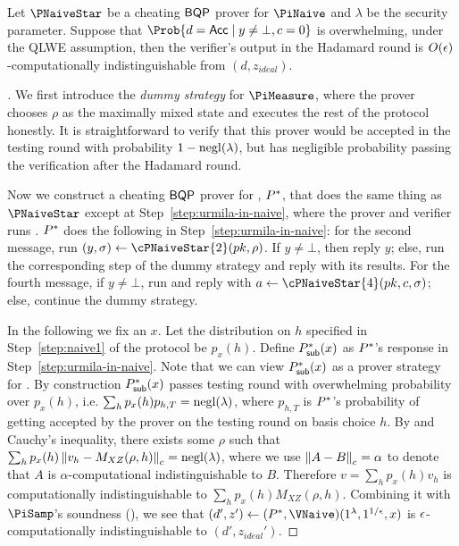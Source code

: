 \begin{theorem}
	\label{lem:naive-qpip0-binding}
	Let $\PNaiveStar$ be a cheating $\operatorname{\mathsf{BQP}}$ prover for $\PiNaive$ and $\lambda$ be the security parameter.
	Suppose that $\Prob{d=\Acc\mid y\ne\bot, c=0}$ is overwhelming, 
	under the QLWE assumption, then the verifier's output in the Hadamard round is $O(\epsilon)$-computationally indistinguishable from $(d, z_{ideal})$.
\end{theorem}
\begin{proof}[]
	We first introduce the \emph{dummy strategy} for $\PiMeasure$, where the prover chooses $\rho$ as the maximally mixed state and executes the rest of the protocol honestly.
	It is straightforward to verify that this prover would be accepted in the testing round with probability $1-\operatorname{negl}(\lambda)$,
	but has negligible probability passing the verification  after the Hadamard round.

  
	Now we construct a cheating $\operatorname{\mathsf{BQP}}$ prover for , $P^*$, that does the same thing as $\PNaiveStar$ except at Step~\ref{step:urmila-in-naive}, where the prover and verifier runs . $P^*$ does the following in Step~\ref{step:urmila-in-naive}:
	for the second message, run $(y, \sigma)\leftarrow\cPNaiveStar{2}(pk, \rho)$.
	If $y\ne\bot$, then reply $y$;
	else, run the corresponding step of the dummy strategy and reply with its results.
	For the fourth message, if $y\ne\bot$, run and reply with $a\leftarrow\cPNaiveStar{4}(pk, c, \sigma)$;
	else, continue the dummy strategy.




	 In the following we fix an $x$. Let the distribution on $h$ specified in Step~\ref{step:naive1} of the protocol be $p_x(h)$. Define $P^*_{\mathsf{sub}}(x)$ as $P^*$'s response in Step~\ref{step:urmila-in-naive}. Note that we can view $P^*_{\mathsf{sub}}(x)$ as a prover strategy for . By construction $P^*_{\mathsf{sub}}(x)$ passes testing round with overwhelming probability over $p_x(h)$, i.e. $\sum_h p_x(h) p_{h,T} =\operatorname{negl}(\lambda)$, where $p_{h,T}$ is $P^*$'s probability of getting accepted by the prover on the testing round on basis choice $h$. By  and Cauchy's inequality, there exists some $\rho$ such that  $\sum_h p_x(h) \left\lVert v_h -M_{XZ}(\rho, h)\right\rVert_c = \operatorname{negl}(\lambda)$, where we use $\left\lVert A-B\right\rVert_c=\alpha$ to denote that $A$ is $\alpha$-computational indistinguishable to $B$. Therefore $v= \sum_h p_x(h) v_h$ is computationally indistinguishable to $\sum_h p_x(h) M_{XZ}(\rho, h)$. Combining it with $\PiSamp$'s soundness (), 
	we see that $(d', z')\leftarrow(\Pstar, \VNaive)(1^\lambda, 1^{1/\epsilon}, x)$  is $\epsilon$-computationally indistinguishable to $(d', z_{ideal}')$.


\end{proof}
